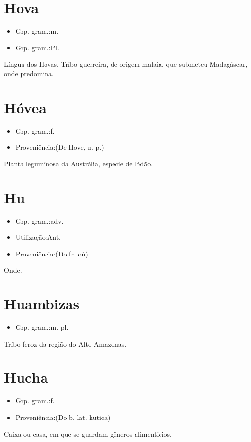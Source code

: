 \documentclass{article}
\begin{document}
\section{Hova}
\begin{itemize}
\item {Grp. gram.:m.}
\end{itemize}
\begin{itemize}
\item {Grp. gram.:Pl.}
\end{itemize}
Língua dos Hovas.
Tríbo guerreira, de origem malaia, que submeteu Madagáscar, onde predomina.
\section{Hóvea}
\begin{itemize}
\item {Grp. gram.:f.}
\end{itemize}
\begin{itemize}
\item {Proveniência:(De \textunderscore Hove\textunderscore , n. p.)}
\end{itemize}
Planta leguminosa da Austrália, espécie de lódão.
\section{Hu}
\begin{itemize}
\item {Grp. gram.:adv.}
\end{itemize}
\begin{itemize}
\item {Utilização:Ant.}
\end{itemize}
\begin{itemize}
\item {Proveniência:(Do fr. \textunderscore où\textunderscore )}
\end{itemize}
Onde.
\section{Huambizas}
\begin{itemize}
\item {Grp. gram.:m. pl.}
\end{itemize}
Tríbo feroz da região do Alto-Amazonas.
\section{Hucha}
\begin{itemize}
\item {Grp. gram.:f.}
\end{itemize}
\begin{itemize}
\item {Proveniência:(Do b. lat. \textunderscore hutica\textunderscore )}
\end{itemize}
Caixa ou casa, em que se guardam gêneros alimenticios.
\end{document}
